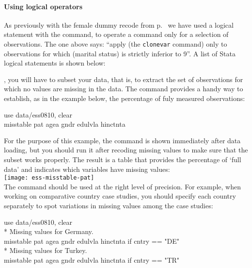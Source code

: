 \paragraph{Using logical operators} %
As previously with the female dummy recode from p.~\pageref{female-dummy} we have used a logical statement with the  command, to operate a command only for a selection of observations. The one above says: ``apply (the \texttt{clonevar} command) only to observations for which (marital status) is strictly inferior to 9''. A list of Stata logical statements is shown below:


	
, you will have to subset your data, that is, to extract the set of observations for which no values are missing in the data. The  command provides a handy way to establish, as in the \ESS example below, the percentage of fuly measured observations:

	\begin{docspec}
		use data/ess0810, clear\\
		misstable pat agea gndr edulvla hinctnta
	\end{docspec}
	
	For the purpose of this example, the  command is shown immediately after data loading, but you should run it after recoding missing values to make sure that the subset works properly. The result is a table that provides the percentage of `full data' and indicates which variables have missing values:\\[1em]
	
	\texttt{[image: ess-misstable-pat]}\\[1em]

	The  command should be used at the right level of precision. For example, when working on comparative country case studies, you should specify each country separately to spot variations in missing values among the case studies:\\[1em]
	
	\begin{docspec}
		use data/ess0810, clear\\[1em]%
		* Missing values for Germany.\\%
		misstable pat agea gndr edulvla hinctnta if cntry == "DE"\\[1em]%
		* Missing values for Turkey.\\%
		misstable pat agea gndr edulvla hinctnta if cntry == "TR"
	\end{docspec}

